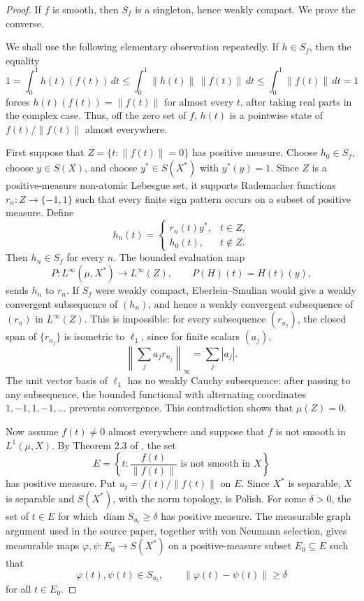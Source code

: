 \documentclass[11pt]{article}
\begin{document}
\begin{proof}
If \(f\) is smooth, then \(S_f\) is a singleton, hence weakly compact. We prove
the converse.

We shall use the following elementary observation repeatedly. If \(h\in S_f\),
then the equality
\[
  1=\int_0^1 h(t)(f(t))\,dt\le \int_0^1 \|h(t)\|\,\|f(t)\|\,dt
     \le \int_0^1\|f(t)\|\,dt=1
\]
forces \(h(t)(f(t))=\|f(t)\|\) for almost every \(t\), after taking real
parts in the complex case. Thus, off the zero set of \(f\), \(h(t)\) is a
pointwise state of \(f(t)/\|f(t)\|\) almost everywhere.

First suppose that \(Z=\{t:\|f(t)\|=0\}\) has positive measure. Choose
\(h_0\in S_f\), choose \(y\in S(X)\), and choose \(y^*\in S(X^*)\) with
\(y^*(y)=1\). Since \(Z\) is a positive-measure non-atomic Lebesgue set, it
supports Rademacher functions \(r_n:Z\to\{-1,1\}\) such that every finite sign
pattern occurs on a subset of positive measure. Define
\[
 h_n(t)=
 \begin{cases}
   r_n(t)y^*, & t\in Z,\\
   h_0(t), & t\notin Z.
 \end{cases}
\]
Then \(h_n\in S_f\) for every \(n\). The bounded evaluation map
\[
  P:L^\infty(\mu,X^*)\longrightarrow L^\infty(Z),\qquad
  P(H)(t)=H(t)(y),
\]
sends \(h_n\) to \(r_n\). If \(S_f\) were weakly compact, Eberlein--Smulian
would give a weakly convergent subsequence of \((h_n)\), and hence a weakly
convergent subsequence of \((r_n)\) in \(L^\infty(Z)\). This is impossible:
for every subsequence \((r_{n_j})\), the closed span of \(\{r_{n_j}\}\) is
isometric to \(\ell_1\), since for finite scalars \((a_j)\),
\[
 \left\|\sum_j a_j r_{n_j}\right\|_\infty=\sum_j |a_j|.
\]
The unit vector basis of \(\ell_1\) has no weakly Cauchy subsequence: after
passing to any subsequence, the bounded functional with alternating
coordinates \(1,-1,1,-1,\ldots\) prevents convergence. This contradiction
shows that \(\mu(Z)=0\).

Now assume \(f(t)\ne0\) almost everywhere and suppose that \(f\) is not smooth
in \(L^1(\mu,X)\). By Theorem 2.3 of \cite{DaptariDwivedi2025}, the set
\[
  E=\left\{t:\frac{f(t)}{\|f(t)\|}\text{ is not smooth in }X\right\}
\]
has positive measure. Put \(u_t=f(t)/\|f(t)\|\) on \(E\). Since
\(X^*\) is separable, \(X\) is separable and \(S(X^*)\), with the norm
topology, is Polish. For some \(\delta>0\), the set of \(t\in E\) for which
\(\operatorname{diam} S_{u_t}\ge \delta\) has positive measure. The measurable
graph argument used in the source paper, together with von Neumann selection,
gives measurable maps \(\varphi,\psi:E_0\to S(X^*)\) on a positive-measure
subset \(E_0\subseteq E\) such that
\[
  \varphi(t),\psi(t)\in S_{u_t},\qquad
  \|\varphi(t)-\psi(t)\|\ge\delta
\]
for all \(t\in E_0\).


\end{proof}
\end{document}

